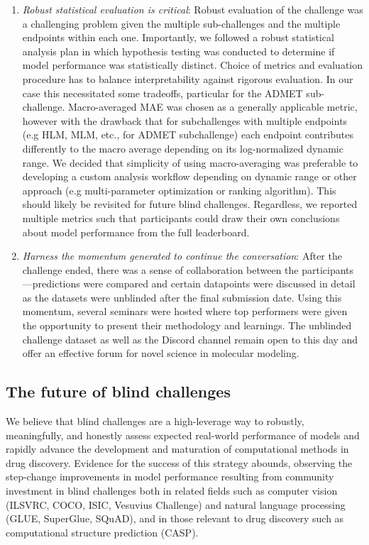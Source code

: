 \documentclass[journal=jcim,manuscript=article]{achemso}
\begin{document}
{\begin{enumerate}
    \item \textit{Robust statistical evaluation is critical}: Robust evaluation of the challenge was a challenging problem given the multiple sub-challenges and the multiple endpoints within each one. Importantly, we followed a robust statistical analysis plan in which hypothesis testing was conducted to determine if model performance was statistically distinct\cite{ash_practically_2024}.  Choice of metrics and evaluation procedure has to balance interpretability against rigorous evaluation. In our case this necessitated some tradeoffs, particular for the ADMET sub-challenge. Macro-averaged MAE was chosen as a generally applicable metric, however with the drawback that for subchallenges with multiple endpoints (e.g HLM, MLM, etc., for ADMET subchallenge) each endpoint contributes differently to the macro average depending on its log-normalized dynamic range.  We decided that simplicity of using macro-averaging was preferable to developing a custom analysis workflow depending on dynamic range or other approach (e.g multi-parameter optimization or ranking algorithm). This should likely be revisited for future blind challenges. Regardless, we reported multiple metrics such that participants could draw their own conclusions about model performance from the full leaderboard.
    \item \textit{Harness the momentum generated to continue the conversation}: After the challenge ended, there was a sense of collaboration between the participants---predictions were compared and certain datapoints were discussed in detail as the datasets were unblinded after the final submission date. Using this momentum, several seminars were hosted where top performers were given the opportunity to present their methodology and learnings. The unblinded challenge dataset as well as the Discord channel remain open to this day and offer an effective forum for novel science in molecular modeling.
\end{enumerate}


\subsection{The future of blind challenges}

We believe that blind challenges are a high-leverage way to robustly, meaningfully, and honestly assess expected real-world performance of models and rapidly advance the development and maturation of computational methods in drug discovery. 
Evidence for the success of this strategy abounds, observing the step-change improvements in model performance resulting from community investment in blind challenges both in related fields such as computer vision (ILSVRC\cite{ILSVRC15}, COCO\cite{coco}, ISIC\cite{tschandl_humancomputer_2020}, Vesuvius Challenge\cite{vesuvius}) and natural language processing (GLUE\cite{wang2019gluemultitaskbenchmarkanalysis}, SuperGlue\cite{sarlin2020supergluelearningfeaturematching},  SQuAD\cite{rajpurkar2016squad100000questionsmachine}), and in those relevant to drug discovery such as computational structure prediction (CASP)\cite{casp13_2019, casp14_2021, casp15_2023}. 

}
\end{document}
